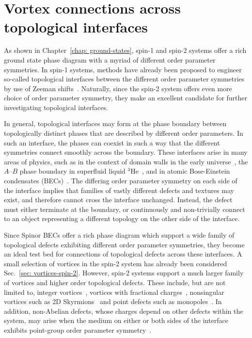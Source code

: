 \chapter{Vortex connections across topological interfaces}\label{chap: spin-2}
As shown in Chapter~\ref{chap: ground-states}, spin-1 and spin-2 systems offer a
rich ground state phase diagram with a myriad of different order parameter
symmetries.
In spin-1 systems, methods have already been proposed to engineer so-called
topological interfaces between the different order parameter
symmetries by use of Zeeman shifts~\cite{Borgh2012, Borgh2013, Borgh2014}.
Naturally, since the spin-2 system offers even more choice of order parameter
symmetry, they make an excellent candidate for further investigating topological
interfaces.

In general, topological interfaces may form at the phase boundary between
topologically distinct phases that are described by different order parameters.
In such an interface, the phases can coexist in such a way that the different
symmetries connect smoothly across the boundary.
These interfaces arise in many areas of physics, such as in the context of
domain walls in the early universe~\cite{Zeldovich1975,Kibble1976,Kibble1980},
the \(A\)--\(B\) phase boundary in superfluid liquid \(^3\)He~\cite{
    Osheroff1977,Yip1986,Salomaa1987,Finne2006,Bradley2007,Volovik2009}, and in
atomic Bose-Einstein condensates (BECs)~\cite{Takeuchi2006,Kasamatsu2010,
    Borgh2012,Borgh2013, Borgh2014,Kaneda2014}.
The differing order parameter symmetry on each side of the interface implies
that families of vastly different defects and textures may exist, and therefore
cannot cross the interface unchanged.
Instead, the defect must either terminate at the boundary, or continuously
and non-trivially connect to an object representing a different topology on the
other side of the interface.

Since Spinor BECs offer a rich phase diagram which support a wide family of
topological defects exhibiting different order parameter symmetries, they become
an ideal test bed for connections of topological defects across these
interfaces.
A small selection of vortices in the spin-2 system has already been considered
Sec.~\ref{sec: vortices-spin-2}.
However, spin-2 systems support a much larger family of vortices and higher
order topological defects. 
These include, but are not limited to, integer vortices~\cite{Yip1999,
Isoshima2002,Mizushima2002, Sadler2006,Semenoff2007,Lovegrove2012,
Lovegrove2016,Borgh2016,Weiss2019,Xiao2021,Xiao2022}, vortices with fractional
charges~\cite{Leonhardt2000,Zhou2003,Ji2008,Seo2015,Semenoff2007,Kobayashi2009,
Lovegrove2012,Lovegrove2016,Borgh2016,Borgh2017,Xiao2021,Xiao2022}, nonsingular
vortices such as 2D Skyrmions~\cite{Ohmi1998, Ho1998, Mizushima2002a,
Martikainen2002, Leanhardt2003, Mizushima2004, Choi2012, Choi2012a,
Lovegrove2014,Weiss2019} and point defects such as monopoles~\cite{Stoof2001,
Savage2003,Ruostekoski2003,Pietila2009,Ray2014,Ray2015,Ollikainen2017,
Mithun2022}.
In addition, non-Abelian defects, whose charges depend on other defects within
the system, may arise when the medium on either or both sides of the interface
exhibits point-group order parameter symmetry~\cite{Xiao2022}.

